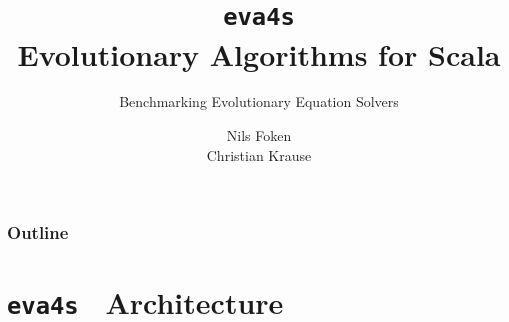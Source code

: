 \documentclass[compress,xcolor=table]{beamer}
\begin{document}
\title{\texttt{eva4s}\\Evolutionary Algorithms for Scala}
\subtitle{Benchmarking Evolutionary Equation Solvers}
\author[Foken,Krause]{Nils Foken\\Christian Krause}
\subject{Evolutionary Algorithms}

\frame[plain]{\titlepage}

\begin{frame}
  \frametitle{Outline}
  \tableofcontents[hideallsubsections]
\end{frame}







\section{\texttt{eva4s} \textendash\ Architecture}
\end{document}
